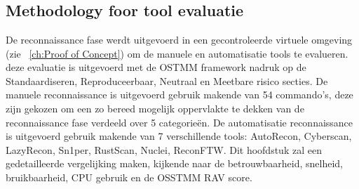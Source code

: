 
\chapter{}
\label{ch:geautomatiseerde Reconnaissance}

\section{Methodology foor tool evaluatie}

De reconnaissance fase werdt uitgevoerd in een gecontroleerde virtuele omgeving (zie ~\ref{ch:Proof of Concept}) om de manuele en automatisatie tools te evalueren.
deze evaluatie is uitgevoerd met de OSTMM framework nadruk op de Standaardiseren, Reproduceerbaar, Neutraal en Meetbare risico secties.
De manuele reconnaissance is uitgevoerd gebruik makende van 54 commando's, deze zijn gekozen om een zo bereed mogelijk oppervlakte te dekken van de reconnaissance fase verdeeld over 5 categorieën.
De automatisatie reconnaissance is uitgevoerd gebruik makende van 7 verschillende tools: AutoRecon, Cyberscan, LazyRecon, Sn1per, RustScan, Nuclei, ReconFTW.
Dit hoofdstuk zal een gedetailleerde vergelijking maken, kijkende naar de betrouwbaarheid, snelheid, bruikbaarheid, CPU gebruik en de OSSTMM RAV score.


